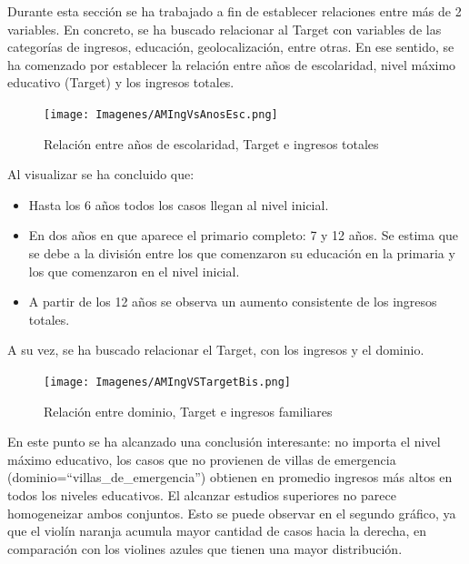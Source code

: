 \documentclass[a4paper]{article}
\begin{document}
        Durante esta sección se ha trabajado a fin de establecer relaciones entre más de 2 variables. En concreto, se ha buscado relacionar al Target con variables de las categorías de ingresos, educación, geolocalización, entre otras.
        En ese sentido, se ha comenzado por establecer la relación entre años de escolaridad, nivel máximo educativo (Target) y los ingresos totales.
 
        \begin{figure}[H]
            \centering
            \texttt{[image: Imagenes/AMIngVsAnosEsc.png]}
            \caption{Relación entre años de escolaridad, Target e ingresos totales}
            \label{AM Scholar Years, Taget and Total Income}
        \end{figure}
 
        Al visualizar se ha concluido que:
 
        \begin{itemize}
            \item Hasta los 6 años todos los casos llegan al nivel inicial.
            \item En dos años en que aparece el primario completo: 7 y 12 años. Se estima que se debe a la división entre los que comenzaron su educación en la primaria y los que comenzaron en el nivel inicial.
            \item A partir de los 12 años se observa un aumento consistente de los ingresos totales.
        \end{itemize}
        \vspace{1cm}

        A su vez, se ha buscado relacionar el Target, con los ingresos y el dominio.
 
        \begin{figure}[H]
            \centering
            \texttt{[image: Imagenes/AMIngVSTargetBis.png]}
            \caption{Relación entre dominio, Target e ingresos familiares}
            \label{AM Dominio, Taget and Familiar Income}
        \end{figure}

 
        En este punto se ha alcanzado una conclusión interesante: no importa el nivel máximo educativo, los casos que no provienen de villas de emergencia (dominio=``villas\_de\_emergencia'') obtienen en promedio ingresos más altos en todos los niveles educativos. El alcanzar estudios superiores no parece homogeneizar ambos conjuntos. Esto se puede observar en el segundo gráfico, ya que el violín naranja acumula mayor cantidad de casos hacia la derecha, en comparación con los violines azules que tienen una mayor distribución.
        
\end{document}

